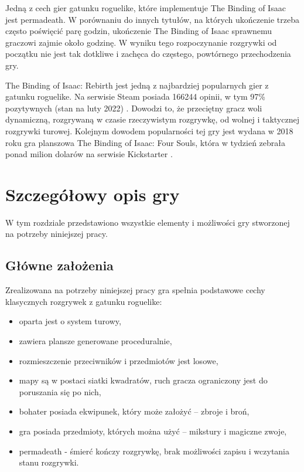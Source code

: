 \documentclass[12pt,twoside]{article}
\begin{document}
Jedną z cech gier gatunku roguelike, które implementuje The Binding of Isaac jest permadeath. W porównaniu do innych tytułów, na których ukończenie trzeba często poświęcić parę godzin, ukończenie The Binding of Isaac sprawnemu graczowi zajmie około godzinę. W wyniku tego rozpoczynanie rozgrywki od początku nie jest tak dotkliwe i zachęca do częstego, powtórnego przechodzenia gry.


The Binding of Isaac: Rebirth jest jedną z najbardziej popularnych gier z gatunku roguelike. Na serwisie Steam posiada 166244 opinii, w tym 97\% pozytywnych (stan na luty 2022) \cite{tboi_steam}. Dowodzi to, że przeciętny gracz woli dynamiczną, rozgrywaną w czasie rzeczywistym rozgrywkę, od wolnej i taktycznej rozgrywki turowej. Kolejnym dowodem popularności tej gry jest wydana w 2018 roku gra planszowa The Binding of Isaac: Four Souls, która w tydzień zebrała ponad milion dolarów na serwisie Kickstarter \cite{tboi_4souls}.



\clearpage	

\section{Szczegółowy opis gry}

W tym rozdziale przedstawiono wszystkie elementy i możliwości gry stworzonej na potrzeby niniejszej pracy.


\subsection{Główne założenia}
Zrealizowana na potrzeby niniejszej pracy gra spełnia podstawowe cechy klasycznych rozgrywek z gatunku roguelike:

\begin{itemize}
	\item oparta jest o system turowy,
	\item zawiera plansze generowane proceduralnie,
	\item rozmieszczenie przeciwników i przedmiotów jest losowe,
	\item mapy są w postaci siatki kwadratów, ruch gracza ograniczony jest do poruszania się po nich,
	\item bohater posiada ekwipunek, który może założyć -- zbroje i broń,
	\item gra posiada przedmioty, których można użyć -- mikstury i magiczne zwoje,
	\item permadeath - śmierć kończy rozgrywkę, brak możliwości zapisu i wczytania stanu rozgrywki.		
\end{itemize}
\end{document}
